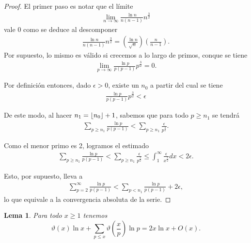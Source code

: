 \documentclass[10pt]{article}
\DeclarePairedDelimiter\floor{\lfloor}{\rfloor}
\newtheorem{lemma}[theorem]{Lema}
\theoremstyle{definition}
\theoremstyle{remark}
\begin{document}
\begin{proof}
El primer paso es notar que el l\'imite
\begin{align}
\lim_{n \to \infty} \frac{\ln n}{n (n - 1)} n^\frac{3}{2}
\end{align}
vale $0$ como se deduce al descomponer 
\begin{align}
\frac{\ln n}{n (n - 1)} n^\frac{3}{2} = \left(\frac{\ln n}{\sqrt{n}}\right)\left(\frac{n}{n - 1}\right).
\end{align}
Por supuesto, lo mismo es v\'alido si crecemos a lo largo de primos, conque se tiene 
\begin{align}
\lim_{p \to \infty} \frac{\ln p}{p (p - 1)} p^\frac{3}{2}=0.
\end{align}

Por definici\'on entonces, dado $\epsilon > 0$, existe un $n_0$ 
a partir del cual se tiene 
\begin{align}
\frac{\ln p}{p (p - 1)} p^\frac{3}{2} < \epsilon
\end{align}

De este modo, al hacer $n_1 = \floor{n_0} + 1$, sabemos que para todo $p \geq n_1$ se tendr\'a 
\begin{align}
\sum_{p \geq n_1} \frac{\ln p}{p (p - 1)} <  \sum_{p \geq n_1} \frac{\epsilon}{p^\frac{3}{2}}. 
\end{align}

Como el menor primo es 2, logramos el estimado 
\begin{align}
\sum_{p \geq n_1} \frac{\ln p}{p (p - 1)} <  \sum_{p \geq n_1} \frac{\epsilon}{p^\frac{3}{2}} \le \int_{1}^\infty \frac{\epsilon}{x^\frac{3}{2}} dx  < 2 \epsilon. 
\end{align}

Esto, por supuesto, lleva a 
\begin{align}
\sum_{p = 2}^\infty \frac{\ln p}{p (p - 1)} < \sum_{p < n_1} \frac{\ln p}{p (p - 1)} + 2 \epsilon, 
\end{align}
lo que equivale a la convergencia absoluta de la serie. 
\end{proof}

\begin{lemma}\label{lem20}
Para todo $x \geq 1$ tenemos
\[
\vartheta(x)\ln x + \sum_{p \leq x} \vartheta\left(\frac{x}{p}\right)\ln p = 2x\ln x + O(x).
\]
\end{lemma}
\end{document}
